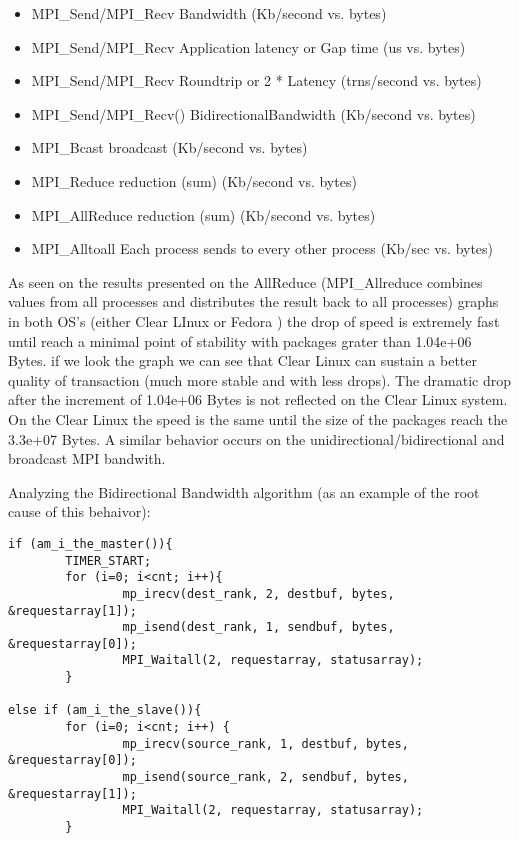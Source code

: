 \begin{itemize}

\item MPI\_Send/MPI\_Recv Bandwidth (Kb/second vs. bytes) 
\item MPI\_Send/MPI\_Recv Application latency or Gap time (us vs. bytes) 
\item MPI\_Send/MPI\_Recv Roundtrip or 2 * Latency (trns/second vs. bytes) 
\item MPI\_Send/MPI\_Recv() BidirectionalBandwidth (Kb/second vs. bytes) 
\item MPI\_Bcast broadcast (Kb/second vs. bytes) 
\item MPI\_Reduce reduction (sum) (Kb/second vs. bytes) 
\item MPI\_AllReduce reduction (sum) (Kb/second vs. bytes) 
\item MPI\_Alltoall Each process sends to every other process (Kb/sec vs. bytes) 

\end{itemize}

As seen on the results presented on the AllReduce (MPI\_Allreduce
combines values from all processes and distributes the result back to all
processes) graphs in both OS's (either Clear LInux or Fedora ) the drop of speed 
is extremely fast until reach a minimal point of stability with packages grater 
than 1.04e+06 Bytes. if we look the graph we can see that Clear Linux can sustain
a better quality of transaction (much more stable and with less drops). The 
dramatic drop after the increment of 1.04e+06 Bytes is not reflected on the 
Clear Linux system. On the Clear Linux  the speed is the same until the size of the 
packages reach the 3.3e+07 Bytes. A similar behavior occurs on the
unidirectional/bidirectional and broadcast MPI bandwith. 


Analyzing the  Bidirectional Bandwidth algorithm (as an example of the root
cause of this behaivor): 

\begin{lstlisting} 
if (am_i_the_master()){                                                                           
        TIMER_START;                                                              
        for (i=0; i<cnt; i++){
                mp_irecv(dest_rank, 2, destbuf, bytes, &requestarray[1]);                 
                mp_isend(dest_rank, 1, sendbuf, bytes, &requestarray[0]);                 
                MPI_Waitall(2, requestarray, statusarray);                                
        }   
        
else if (am_i_the_slave()){
        for (i=0; i<cnt; i++) {
                mp_irecv(source_rank, 1, destbuf, bytes, &requestarray[0]);               
                mp_isend(source_rank, 2, sendbuf, bytes, &requestarray[1]);               
                MPI_Waitall(2, requestarray, statusarray);                                
        }                 
         
\end{lstlisting}


